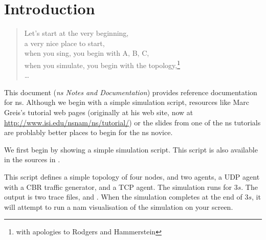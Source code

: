 
\chapter{Introduction}

\begin{quote}
Let's start at the very beginning, \\
a very nice place to start, \\
when you sing, you begin with A, B, C, \\
when you simulate, you begin with the topology,\footnote{%
with apologies to Rodgers and Hammerstein}\\
\ldots
\end{quote}

This document (\emph{ns Notes and Documentation}) provides reference
  documentation for ns.
Although we begin with a simple simulation script,
  resources like Marc Greis's tutorial web pages
  (originally at his web site,
  now at \url{http://www.isi.edu/nsnam/ns/tutorial/})
  or the slides from one of the ns tutorials
  are problably better places to begin for the ns novice.

We first begin by showing a simple simulation script.
This script is also available in the sources in
.

This script defines a simple topology of four nodes,
and two agents, a UDP agent with a CBR traffic generator, and a TCP agent.
The simulation runs for $3s$.  The output is two trace files,
 and .
When the simulation completes at the end of $3s$,
it will attempt to run a nam visualisation of the simulation on your
screen.

